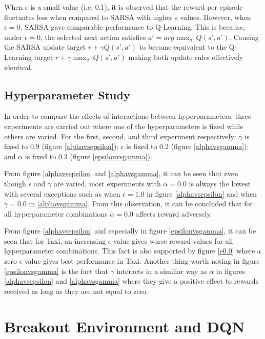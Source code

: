 \documentclass[11pt]{article}
\begin{document}
When $\epsilon$ is a small value (i.e. 0.1), it is observed that the reward per episode fluctuates less when compared to SARSA with higher $\epsilon$ values. However, when $\epsilon = 0$, SARSA gave comparable performance to Q-Learning. This is because, under $\epsilon = 0$, the selected next action satisfies $a' = arg \max_{a'}Q(s',a')$. Causing the SARSA update target $r + \gamma Q(s',a')$ to become equivalent to the Q-Learning target $r + \gamma \max_{a'} Q(s', a')$ making both update rules effectively identical.


\subsection*{Hyperparameter Study}

In order to compare the effects of interactions between hyperparameters, three experiments are carried out where one of the hyperparameters is fixed while others are varied. For the first, second, and third experiment respectively: $\gamma$ is fixed to 0.9 (figure \ref{alphavsepsilon}); $\epsilon$ is fixed to 0.2 (figure \ref{alphavsgamma}); and $\alpha$ is fixed to 0.3 (figure \ref{epsilonvsgamma}).

From figure \ref{alphavsepsilon} and \ref{alphavsgamma}, it can be seen that even though $\epsilon$ and $\gamma$ are varied, most experiments with $\alpha = 0.0$ is always the lowest with several exceptions such as when $\epsilon = 1.0$ in figure \ref{alphavsepsilon} and when $\gamma = 0.0$ in \ref{alphavsgamma}. From this observation, it can be concluded that for all hyperparameter combinations $\alpha = 0.0$ affects reward adversely.

From figure \ref{alphavsepsilon} and especially in figure \ref{epsilonvsgamma}, it can be seen that for Taxi, an increasing $\epsilon$ value gives worse reward values for all hyperparameter combinations. This fact is also supported by figure \ref{e0.0} where a zero $\epsilon$ value gives best performance in Taxi. Another thing worth noting in figure \ref{epsilonvsgamma} is the fact that $\gamma$ interacts in a similiar way as $\alpha$ in figures \ref{alphavsepsilon} and \ref{alphavsgamma} where they give a positive effect to rewards received as long as they are not equal to zero.

\section*{Breakout Environment and DQN}
\end{document}
